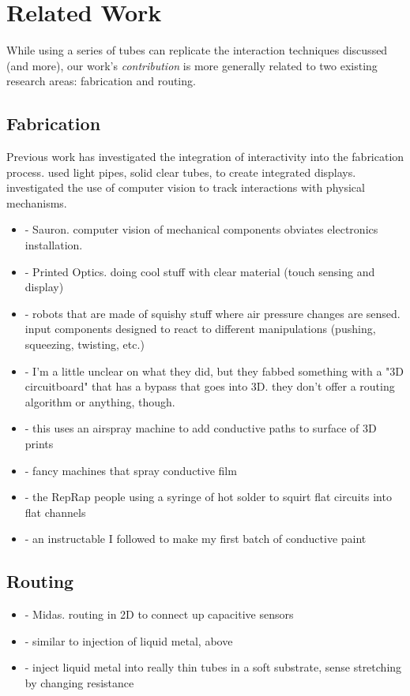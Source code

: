 \section{Related Work}

While using a series of tubes can replicate the interaction techniques discussed (and more), our work's \emph{contribution} is more generally related to two existing research areas: fabrication and routing.

\subsection{Fabrication}

Previous work has investigated the integration of interactivity into the fabrication process.  \cite{Willis-printedoptics} used light pipes, solid clear tubes, to create integrated displays.  \cite{Savage-sauron} investigated the use of computer vision to track interactions with physical mechanisms.
\begin{itemize}
\item \cite{Savage-sauron} - Sauron.  computer vision of mechanical components obviates electronics installation.
\item \cite{Willis-printedoptics} - Printed Optics.  doing cool stuff with clear material (touch sensing and display)
\item \cite{Slyper-pressure} - robots that are made of squishy stuff where air pressure changes are sensed.  input components designed to react to different manipulations (pushing, squeezing, twisting, etc.)
\item \cite{Navarrette-gps} - I'm a little unclear on what they did, but they fabbed something with a "3D circuitboard" that has a bypass that goes into 3D.  they don't offer a routing algorithm or anything, though.
\item \cite{Sarik-tracebrush} - this uses an airspray machine to add conductive paths to surface of 3D prints
\item \cite{Optomec-main} - fancy machines that spray conductive film
\item \cite{Sells-reprap} - the RepRap people using a syringe of hot solder to squirt flat circuits into flat channels
\item \cite{icecats-conductivepaint} - an instructable I followed to make my first batch of conductive paint
\end{itemize}

\subsection{Routing}
\begin{itemize}
\item \cite{Savage-midas} - Midas.  routing in 2D to connect up capacitive sensors
\item \cite{Park-microchannels} - similar to injection of liquid metal, above
\item \cite{Majidi-curvature} - inject liquid metal into really thin tubes in a soft substrate, sense stretching by changing resistance
\end{itemize}

